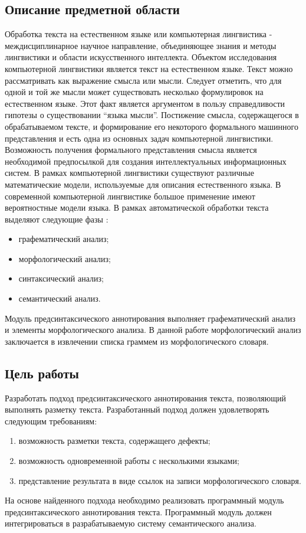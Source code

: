 \subsection{Описание предметной области}
Обработка текста на естественном языке или компьютерная лингвистика - междисциплинарное научное направление, объединяющее знания и методы лингвистики и области искусственного интеллекта. Объектом исследования компьютерной лингвистики является текст на естественном языке. Текст можно рассматривать как выражение смысла или мысли. Следует отметить, что для одной и той же мысли может существовать несколько формулировок на естественном языке. Этот факт является аргументом в пользу справедливости гипотезы о существовании “языка мысли”. Постижение смысла, содержащегося в обрабатываемом тексте, и формирование его некоторого формального машинного представления и есть одна из основных задач компьютерной лингвистики. Возможность получения формального представления смысла является необходимой предпосылкой для создания интеллектуальных информационных систем. В рамках компьютерной лингвистики существуют различные математические модели, используемые для описания естественного языка. В современной компьютерной лингвистике большое применение имеют вероятностные модели языка. В рамках автоматической обработки текста выделяют следующие фазы \cite{sokirko}:
\begin{itemize}
\item
графематический анализ;
\item
морфологический анализ;
\item
синтаксический анализ;
\item
семантический анализ.
\end{itemize}
Модуль предсинтаксического аннотирования выполняет графематический анализ и элементы морфологического анализа. В данной работе морфологический анализ заключается в извлечении списка граммем из морфологического словаря.


\subsection{Цель работы}
Разработать подход предсинтаксического аннотирования текста, позволяющий выполнять разметку текста. Разработанный подход должен удовлетворять следующим требованиям:
\begin{enumerate}
	\item 
	возможность разметки текста, содержащего дефекты;
	\item
	возможность одновременной работы с несколькими языками;
	\item
	представление результата в виде ссылок на записи морфологического словаря.
\end{enumerate}
На основе найденного подхода необходимо реализовать программный модуль предсинтаксического аннотирования текста. Программный модуль должен интегрироваться в разрабатываемую систему семантического анализа.

